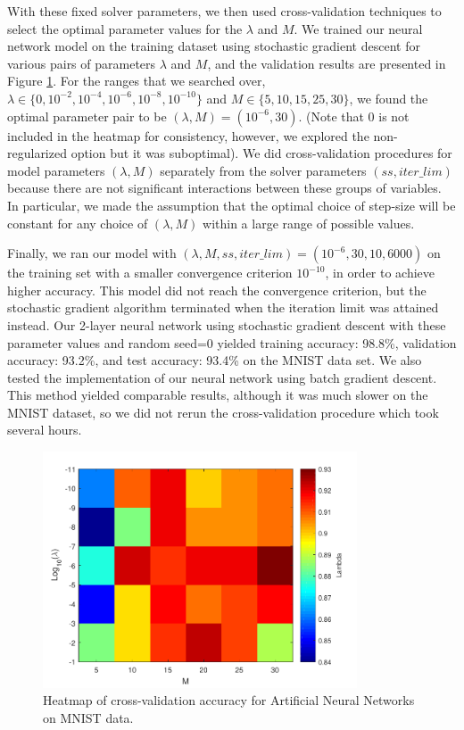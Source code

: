 With these fixed solver parameters, we then used cross-validation techniques to select the optimal parameter values for the $\lambda$ and $M$. We trained our neural network model on the training dataset using stochastic gradient descent for various pairs of parameters $\lambda$ and $M$, and the validation results are presented in Figure \ref{fig:mnist_cv}.  For the ranges that we searched over, $\lambda \in \{0, 10^{-2}, 10^{-4}, 10^{-6}, 10^{-8}, 10^{-10}\}$ and $M \in \{5, 10, 15, 25, 30\}$, we found the optimal parameter pair to be $(\lambda, M) = (10^{-6}, 30)$.  (Note that 0 is not included in the heatmap for consistency, however, we explored the non-regularized option but it was suboptimal).  We did cross-validation procedures for model parameters $(\lambda, M)$ separately from the solver parameters $(ss, iter\_lim)$ because there are not significant interactions between these groups of variables.  In particular, we made the assumption that the optimal choice of step-size will be constant for any choice of $(\lambda, M)$ within a large range of possible values.  

Finally, we ran our model with $(\lambda, M, ss, iter\_lim) = (10^{-6}, 30, 10, 6000)$ on the training set with a smaller convergence criterion $10^{-10}$, in order to achieve higher accuracy. This model did not reach the convergence criterion, but the stochastic gradient algorithm terminated when the iteration limit was attained instead.  Our 2-layer neural network using stochastic gradient descent with these parameter values and random seed=0 yielded training accuracy: 98.8\%, validation accuracy: 93.2\%, and test accuracy: 93.4\% on the MNIST data set.  We also tested the implementation of our neural network using batch gradient descent.  This method yielded comparable results, although it was much slower on the MNIST dataset, so we did not rerun the cross-validation procedure which took several hours.  

\begin{figure}
\centering
	\includegraphics[height=70mm]{mnist_cv.pdf}
    \caption{Heatmap of cross-validation accuracy for Artificial Neural Networks on MNIST data.}  \label{fig:mnist_cv}  
\end{figure}
